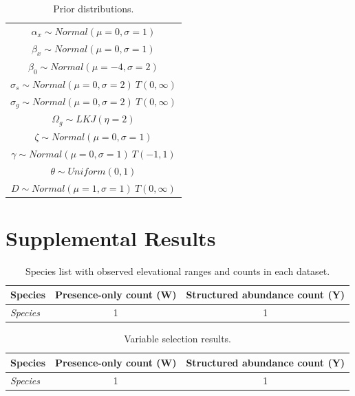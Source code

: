 \documentclass[preprint,review,times,12pt,3p]{elsarticle}
\begin{document}
\begin{table}[ht]
	\centering
	\begin{tabular}{c}
		\hline
		$\alpha_x \sim Normal(\mu=0, \sigma=1)$ \\
		$\beta_x \sim Normal(\mu=0, \sigma=1)$ \\
		$\beta_0 \sim Normal(\mu=-4, \sigma=2)$ \\
		$\sigma_s \sim Normal(\mu=0, \sigma=2) \ T(0,\infty)$\\
		$\sigma_g \sim Normal(\mu=0, \sigma=2) \ T(0,\infty)$\\
		$\Omega_g \sim LKJ(\eta=2)$ \\
		$\zeta \sim Normal(\mu=0, \sigma=1)$\\
		$\gamma \sim Normal(\mu=0, \sigma=1) \ T(-1,1)$\\
		$\theta \sim Uniform(0,1)$ \\
		$D \sim Normal(\mu=1, \sigma=1) \ T(0,\infty)$ \\
		\hline
	\end{tabular}
	\caption{\label{table:priors} Prior distributions. }
\end{table}



\newpage

\lstset{basicstyle=\scriptsize}






\newpage

\section{Supplemental Results}

\begin{table}[ht]
	\centering
	\begin{tabular}{ l c c}
		\hline
		\textbf{Species} & \textbf{Presence-only count (W)} & \textbf{Structured abundance count (Y)}  \\
		\hline
		\emph{Species} & 1 & 1  \\
	\end{tabular}
	\caption{\label{table:species_list} Species list with observed elevational ranges and counts in each dataset. }
\end{table}


\begin{table}[ht]
	\centering
	\begin{tabular}{ l c c}
		\hline
		\textbf{Species} & \textbf{Presence-only count (W)} & \textbf{Structured abundance count (Y)}  \\
		\hline
		\emph{Species} & 1 & 1  \\
	\end{tabular}
	\caption{\label{table:cross-validation} Variable selection results. }
\end{table}
\end{document}
